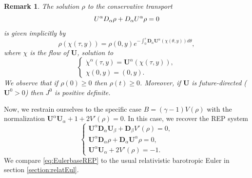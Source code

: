 \documentclass[a4paper, 15pt]{article}
\numberwithin{equation}{section}
\newtheorem{rem}[defi]{Remark}
\begin{document}
\begin{rem}
\label{rem:rhoremarkREP}
The solution $\rho$ to the conservative transport 
\begin{equation}
\label{eq:conservtpREP}
    \textbf{U}^\alpha\textbf{D}_\alpha \rho+\textbf{D}_\alpha \textbf{U}^\alpha\rho=0\\
\end{equation}
is given implicitly by 
\begin{equation}
\label{eq:implicitrhoREP}
    \rho(\chi(\tau,y))=\rho(0,y)e^{-\int^\tau_0{\textbf{D}_\alpha \textbf{U}^\alpha(\chi(\theta,y))d\theta}},
\end{equation}
where $\chi$ is the flow of $\textbf{U}$, solution to 
\begin{equation}
    \begin{cases}
        \label{eq:flowlineREP}\dot{\chi}^\alpha(\tau,y)=\textbf{U}^\alpha(\chi(\tau,y)),\\
        \chi(0,y)=(0,y).
    \end{cases}
\end{equation}
We observe that if $\rho(0)\geq0$ then $\rho(t)\geq0$. Moreover, if $\textbf{U}$ is future-directed ($\textbf{U}^0>0$) then $J^0$ is positive definite. 
\end{rem}
Now, we restrain ourselves to the specific case $B=(\gamma-1)V(\rho)$ with the normalization $\textbf{U}^\alpha \textbf{U}_\alpha+1+2V'(\rho)=0$. In this case, we recover the REP system 
\begin{equation}
\label{eq:EulerbaseREP}
\begin{cases}
\textbf{U}^\alpha\textbf{D}_\alpha \textbf{U}_\beta+\textbf{D}_\beta V'(\rho)=0,\\
\textbf{U}^\alpha\textbf{D}_\alpha \rho+\textbf{D}_\alpha \textbf{U}^\alpha\rho=0,\\
\textbf{U}^\alpha \textbf{U}_\alpha+2V'(\rho)=-1.
\end{cases}
\end{equation}
We compare \eqref{eq:EulerbaseREP} to the usual relativistic barotropic Euler in section \ref{section:relatEul}.\\
\end{document}
